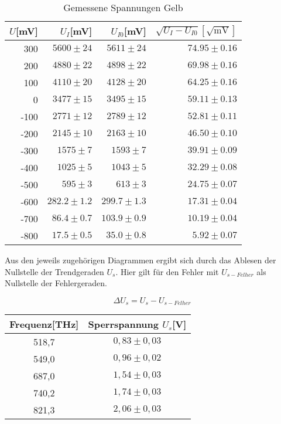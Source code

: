 \begin{table}[h]
  \centering
  \caption{Gemessene Spannungen Gelb}
   \begin{tabular}{r | r | r | r}
    \toprule
    $U$[mV] & $U_I$[mV] & $U_{I0}$[mV] & $\sqrt{U_I  - U_{I0}}[\sqrt{\text{mV}}]$\\
    \midrule
    300   & $5600 \pm 24$ & $5611  \pm24$ & $74.95 \pm 0.16$ \\
    200   &$ 4880 \pm 22 $&$ 4898\pm 22$ & $69.98 \pm 0.16$ \\
    100   & $4110 \pm 20$ & $4128 \pm 20$& $64.25 \pm 0.16$\\
    0     & $3477 \pm 15$ & $3495 \pm 15$ & $59.11 \pm 0.13$ \\
    -100  & $2771 \pm 12 $& $2789 \pm 12$ & $52.81 \pm 0.11$ \\
    -200  & $2145 \pm 10$ &$ 2163 \pm 10$ & $46.50 \pm0.10 $\\
    -300  & $1575 \pm 7$& $1593\pm 7 $& $39.91 \pm 0.09$\\
    -400  & $1025 \pm 5$ & $1043 \pm 5 $& $32.29 \pm 0.08$ \\
    -500  & $595 \pm 3$ & $613 \pm 3$ & $24.75 \pm 0.07 $\\
    -600  & $282.2 \pm 1.2$ & $299.7 \pm 1.3$ &$ 17.31 \pm 0.04$ \\
    -700  & $86.4 \pm 0.7$ & $103.9 \pm 0.9$ & $10.19 \pm 0.04$ \\
    -800  & $17.5  \pm 0.5$ & $35.0  \pm 0.8 $& $5.92 \pm 0.07$ \\
    \bottomrule
    \end{tabular}
\end{table}%
\newpage

Aus den jeweils zugehörigen Diagrammen ergibt sich durch das Ablesen der Nullstelle
der Trendgeraden $U_s$. Hier gilt für den Fehler mit  $U_{s-Felher}$ als
Nullstelle der Fehlergeraden. 

\begin{equation}
    \Delta U_s = U_s - U_{s-Felher}
\end{equation}

\begin{table}[h!]
    \centering
    \begin{tabular}{c | c }
        \toprule
        Frequenz[THz] & Sperrspannung $U_s$[V]\\
        \midrule
        518,7 & $0,83 \pm 0,03$ \\
        549,0 & $0,96 \pm 0,02$ \\
        687,0 & $1,54 \pm 0,03$ \\
        740,2 & $1,74 \pm 0,03$ \\
        821,3 & $ 2,06 \pm 0,03$ \\
        
    \end{tabular}
\end{table}

